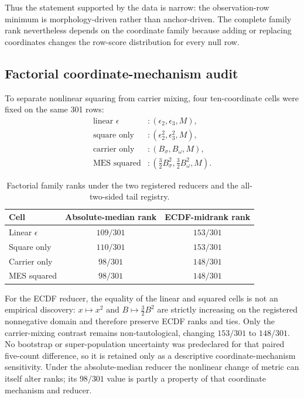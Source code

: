 \documentclass[11pt,a4paper]{article}
\begin{document}
Thus the statement supported by the data is narrow: the observation-row
minimum is morphology-driven rather than anchor-driven.  The complete family
rank nevertheless depends on the coordinate family because adding or replacing
coordinates changes the row-score distribution for every null row.

\subsection{Factorial coordinate-mechanism audit}

To separate nonlinear squaring from carrier mixing, four ten-coordinate cells
were fixed on the same 301 rows:
\begin{align*}
\text{linear }\epsilon &: (\epsilon_2,\epsilon_3,M),\\
\text{square only} &: (\epsilon_2^2,\epsilon_3^2,M),\\
\text{carrier only} &: (B_\sigma,B_\omega,M),\\
\text{MES squared} &: (\tfrac32B_\sigma^2,\tfrac32B_\omega^2,M).
\end{align*}

\begin{table}[H]
\centering
\small
\caption{Factorial family ranks under the two registered reducers and the
all-two-sided tail registry.}
\label{tab:factorial}
\begin{tabular}{@{}lcc@{}}
\toprule
Cell & Absolute-median rank & ECDF-midrank rank\\
\midrule
Linear $\epsilon$ & $109/301$ & $153/301$\\
Square only & $110/301$ & $153/301$\\
Carrier only & $98/301$ & $148/301$\\
MES squared & $98/301$ & $148/301$\\
\bottomrule
\end{tabular}
\end{table}

For the ECDF reducer, the equality of the linear and squared cells is not an
empirical discovery: $x\mapsto x^2$ and
$B\mapsto\tfrac32B^2$ are strictly increasing on the registered nonnegative
domain and therefore preserve ECDF ranks and ties.  Only the carrier-mixing
contrast remains non-tautological, changing $153/301$ to $148/301$.  No
bootstrap or super-population uncertainty was predeclared for that paired
five-count difference, so it is retained only as a descriptive
coordinate-mechanism sensitivity.  Under the absolute-median reducer the
nonlinear change of metric can itself alter ranks; its $98/301$ value is partly
a property of that coordinate mechanism and reducer.
\end{document}
